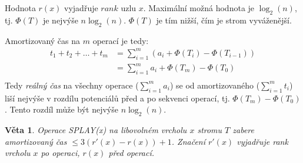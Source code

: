 \documentclass[11pt]{report} %
\newtheorem{theorem}{Věta}[section]
\numberwithin{equation}{section}
\begin{document}
Hodnota $r(x)$ vyjadřuje $rank$ uzlu $x$. Maximální možná hodnota je $\log_2(n)$, tj. $\Phi(T)$ je nejvýše $n\log_2(n)$. $\Phi(T)$ je tím nižší, čím je strom vyváženější.

Amortizovaný čas na $m$ operací je tedy:
\begin{align*}
t_1 + t_2 + \dots + t_m &= \sum\limits_{i=1}^{m} \left(a_i + \Phi(T_i) - \Phi(T_{i-1}) \right) \\
						&= \sum\limits_{i=1}^{m} a_i + \Phi(T_m) - \Phi(T_0) \\	
\end{align*}
Tedy \textit{reálný čas} na všechny operace ($\sum\limits_{i=1}^{m} a_i$) se od amortizovaného ($\sum\limits_{i=1}^{m} t_i$) liší nejvýše v rozdílu potenciálů před a po sekvenci operací, tj. $\Phi(T_m) - \Phi(T_0)$. Tento rozdíl může být nejvýše $n\log_2(n)$.

\begin{theorem}
Operace SPLAY(x) na libovolném vrcholu $x$ stromu $T$ zabere amortizovaný čas $\leq 3(r'(x) - r(x)) + 1$. Značení $r'(x)$ vyjadřuje rank vrcholu $x$ po operaci, $r(x)$ před operací.
\end{theorem}
\end{document}
